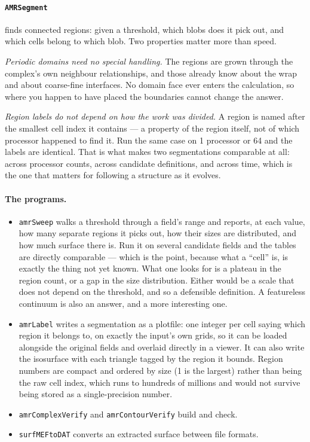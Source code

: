 \documentclass[11pt]{article}
\begin{document}
\paragraph{\texttt{AMRSegment}} finds connected regions: given a threshold, which
blobs does it pick out, and which cells belong to which blob. Two properties
matter more than speed.

\emph{Periodic domains need no special handling.} The regions are grown through
the complex's own neighbour relationships, and those already know about the
wrap and about coarse-fine interfaces. No domain face ever enters the
calculation, so where you happen to have placed the boundaries cannot change
the answer.

\emph{Region labels do not depend on how the work was divided.} A region is
named after the smallest cell index it contains --- a property of the region
itself, not of which processor happened to find it. Run the same case on 1
processor or 64 and the labels are identical. That is what makes two
segmentations comparable at all: across processor counts, across candidate
definitions, and across time, which is the one that matters for following a
structure as it evolves.

\paragraph{The programs.}
\begin{itemize}
\item \texttt{amrSweep} walks a threshold through a field's range and reports,
      at each value, how many separate regions it picks out, how their sizes
      are distributed, and how much surface there is. Run it on several
      candidate fields and the tables are directly comparable --- which is the
      point, because what a ``cell'' is, is exactly the thing not yet known.
      What one looks for is a plateau in the region count, or a gap in the size
      distribution. Either would be a scale that does not depend on the
      threshold, and so a defensible definition. A featureless continuum is
      also an answer, and a more interesting one.
\item \texttt{amrLabel} writes a segmentation as a plotfile: one integer per
      cell saying which region it belongs to, on exactly the input's own grids,
      so it can be loaded alongside the original fields and overlaid directly
      in a viewer. It can also write the isosurface with each triangle tagged by
      the region it bounds. Region numbers are compact and ordered by size
      (1 is the largest) rather than being the raw cell index, which runs to
      hundreds of millions and would not survive being stored as a
      single-precision number.
\item \texttt{amrComplexVerify} and \texttt{amrContourVerify} build and check.
\item \texttt{surfMEFtoDAT} converts an extracted surface between file formats.
\end{itemize}
\end{document}
